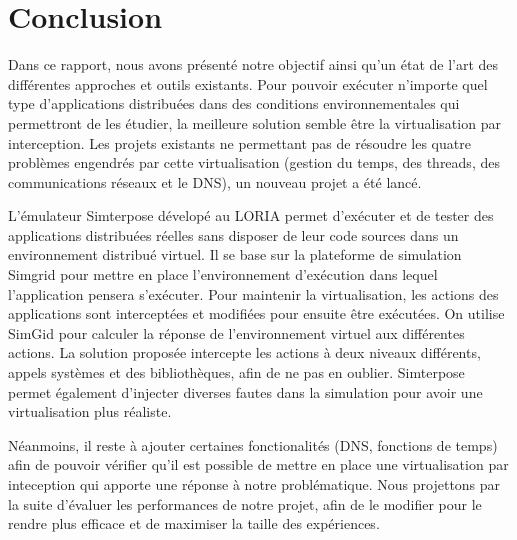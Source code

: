 \section{Conclusion}
\label{section:ccl}

Dans ce rapport, nous avons présenté notre objectif ainsi qu'un état de l'art
des différentes approches et outils existants. Pour pouvoir exécuter n'importe
quel type d'applications distribuées dans des conditions environnementales qui
permettront de les étudier, la meilleure solution semble être la virtualisation
par interception. Les projets existants ne permettant pas de résoudre les quatre
problèmes engendrés par cette virtualisation (gestion du temps, des threads, des
communications réseaux et le DNS), un nouveau projet a été lancé.

L'émulateur Simterpose dévelopé au LORIA permet d'exécuter et de tester des
applications distribuées réelles sans disposer de leur code sources dans un
environnement distribué virtuel. Il se base sur la plateforme de simulation
Simgrid pour mettre en place l'environnement d'exécution dans lequel
l'application pensera s'exécuter. Pour maintenir la virtualisation, les actions
des applications sont interceptées et modifiées pour ensuite être exécutées. On utilise SimGid pour calculer la réponse de l'environnement virtuel aux
différentes actions. La solution proposée intercepte les actions à deux niveaux
différents, appels systèmes et des bibliothèques, afin de ne pas en oublier. Simterpose permet également d'injecter diverses fautes dans la
simulation pour avoir une virtualisation plus réaliste.

Néanmoins, il reste à ajouter certaines fonctionalités (DNS, fonctions de temps)
afin de pouvoir vérifier qu'il est possible de mettre en place une
virtualisation par inteception qui apporte une réponse à notre
problématique. Nous projettons par la suite d'évaluer les performances de notre
projet, afin de le modifier pour le rendre plus efficace et de maximiser la
taille des expériences.

